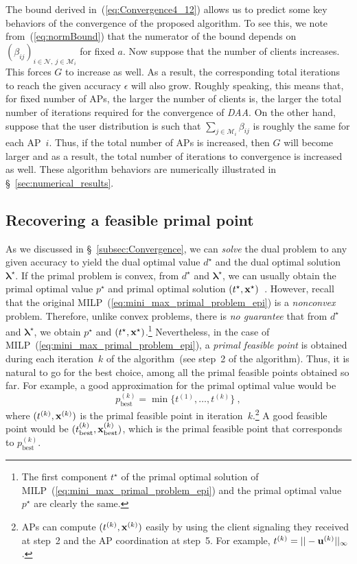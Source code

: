 \documentclass[journal, 10pt, twocolumn]{IEEEtran}
\newcommand{\be}{\begin{equation}}
\newcommand{\ee}{\end{equation}}
\renewcommand{\vec}[1]{\bf{#1}}     \newcommand{\vecsc}[1]{\mbox {\boldmath \scriptsize $#1$}}     \newcommand{\itvec}[1]{\mbox {\boldmath $#1$}}
\begin{document}
The bound derived in~(\ref{eq:Convergence4_12}) allows us to predict some key behaviors of the convergence of the proposed algorithm. To see this, we note from~(\ref{eq:normBound}) that the numerator of the bound depends on $(\beta_{ij})_{i\in\mathcal{N}, \ j\in\mathcal{M}_i}$ for fixed $a$. Now suppose that the number of clients increases. This forces $G$ to increase as well. As a result, the corresponding total iterations to reach the given accuracy $\epsilon$ will also grow. Roughly speaking, this means that, for fixed number of APs, the larger the number of clients is, the larger the total number of iterations required for the convergence of \emph{DAA}. On the other hand, suppose that the user distribution is such that $\sum_{j\in\mathcal{M}_i}\beta_{ij}$ is roughly the same for each AP~$i$. Thus, if the total number of APs is increased, then $G$ will become larger and as a result, the total number of iterations to convergence is increased as well. These algorithm behaviors are numerically illustrated in \S~\ref{sec:numerical_results}.

\vspace{-3mm}
\subsection{Recovering a feasible primal point}\label{subsec:RecoverPrimal}
As we discussed in \S~\ref{subsec:Convergence}, we can \emph{solve} the dual problem to any given accuracy to yield the dual optimal value $d^\star$ and the dual optimal solution~$\boldsymbol\lambda^\star$. If the primal problem is convex, from $d^\star$ and $\boldsymbol\lambda^\star$, we can usually obtain the primal optimal value $p^\star$ and primal optimal solution $(t^\star, {\vec x}^\star)$~\cite[\S~5.5.5]{Boyd-Vandenberghe-04}. However, recall that the original MILP~(\ref{eq:mini_max_primal_problem_epi}) is a \emph{nonconvex} problem. Therefore, unlike convex problems, there is \emph{no guarantee} that from $d^\star$ and $\boldsymbol\lambda^\star$, we obtain $p^\star$ and $(t^\star, {\vec x}^\star)$.\footnote{The first component $t^\star$ of the primal optimal solution of MILP~(\ref{eq:mini_max_primal_problem_epi}) and the primal optimal value $p^\star$ are clearly the same.} Nevertheless, in the case of MILP~(\ref{eq:mini_max_primal_problem_epi}), a \emph{primal feasible point} is obtained during each iteration~$k$ of the algorithm~(see step~2 of the algorithm). Thus, it is natural to go for the best choice, among all the primal feasible points obtained so far. For example, a good approximation for the primal optimal value would be
\be\label{eq:best_primal_objective_afrer_k_itr}
p^{(k)}_{\mathrm{best}}=\min\{t^{(1)},\ldots,t^{(k)}\} \ ,
\ee
where $(t^{(k)}, {\vec x}^{(k)})$ is the primal feasible point in iteration~$k$.\footnote{APs can compute $(t^{(k)}, {\vec x}^{(k)})$ easily by using the client signaling they received at step~2 and the AP coordination at step~5. For example, $t^{(k)}=||-{\vec u}^{(k)}||_{\infty}$.}
A good feasible point would be $(t^{(k)}_{\mathrm{best}}, {\vec x}^{(k)}_{\mathrm{best}})$, which is the primal feasible point that corresponds to $p^{(k)}_{\mathrm{best}}$.
\end{document}
